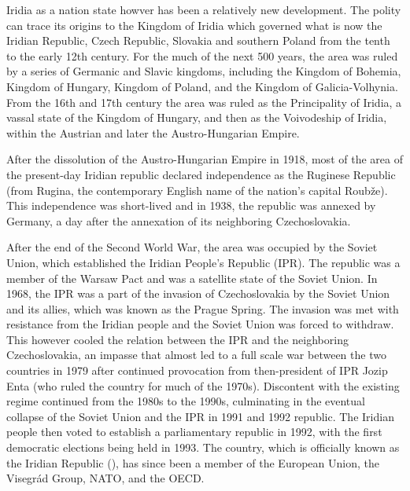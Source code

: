 Iridia as a nation state howver has been a relatively new development. The
polity can trace its origins to the Kingdom of Iridia which governed what is now
the Iridian Republic, Czech Republic, Slovakia and southern Poland from the
tenth to the early 12th century. For the much of the next 500 years, the area
was ruled by a series of Germanic and Slavic kingdoms, including the Kingdom of
Bohemia, Kingdom of Hungary, Kingdom of Poland, and the Kingdom of
Galicia-Volhynia. From the 16th and 17th century the area was ruled as the
Principality of Iridia, a vassal state of the Kingdom of Hungary, and then as
the Voivodeship of Iridia, within the Austrian and later the Austro-Hungarian
Empire.

After the dissolution of the Austro-Hungarian Empire in 1918, most of the area
of the present-day Iridian republic declared independence as the Ruginese
Republic (from Rugina, the contemporary English name of the nation's capital
Roubže). This independence was short-lived and in 1938, the republic was annexed
by Germany, a day after the annexation of its neighboring Czechoslovakia.

After the end of the Second World War, the area was occupied by the Soviet
Union, which established the Iridian People's Republic (IPR). The republic was a
member of the Warsaw Pact and was a satellite state of the Soviet Union. In
1968, the IPR was a part of the invasion of Czechoslovakia by the Soviet Union
and its allies, which was known as the Prague Spring. The invasion was met with
resistance from the Iridian people and the Soviet Union was forced to withdraw.
This however cooled the relation between the IPR and the neighboring
Czechoslovakia, an impasse that almost led to a full scale war between the two
countries in 1979 after continued provocation from then-president of IPR Jozip
Enta (who ruled the country for much of the 1970s). Discontent with the existing
regime continued from the 1980s to the 1990s, culminating in the eventual
collapse of the Soviet Union and the IPR in 1991 and 1992 republic. The Iridian
people then voted to establish a parliamentary republic in 1992, with the first
democratic elections being held in 1993. The country, which is officially known
as the Iridian Republic (), has since been a member of
the European Union, the Visegrád Group, NATO, and the OECD.

